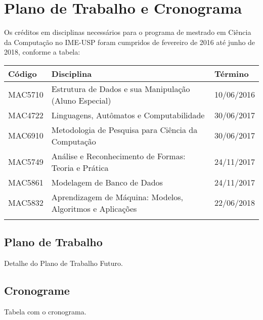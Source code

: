 \chapter{Plano de Trabalho e Cronograma}
\label{cap:Cronogramanotes}

Os créditos em disciplinas necessários para o programa de mestrado em Ciência da Computação
no IME-USP foram cumpridos de fevereiro de 2016 até junho de 2018, conforme a tabela: 

\begin{center}
\begin{tabular}{ |l|l|l| } 
\hline
\textbf{Código} & \textbf{Disciplina}                                       & \textbf{Término} \\ 
\hline
MAC5710     & Estrutura de Dados e sua Manipulação (Aluno Especial)                  & 10/06/2016       \\
MAC4722     & Linguagens, Autômatos e Computabilidade                   & 30/06/2017       \\
MAC6910     & Metodologia de Pesquisa para Ciência da Computação        & 30/06/2017       \\
MAC5749     & Análise e Reconhecimento de Formas: Teoria e Prática      & 24/11/2017       \\
MAC5861     & Modelagem de Banco de Dados                               & 24/11/2017       \\
MAC5832     & Aprendizagem de Máquina: Modelos, Algoritmos e Aplicações & 22/06/2018       \\
\hline
\label{tab:disciplinas}
\end{tabular}
\end{center}

\section{Plano de Trabalho}
\label{sec:plano_de trabalho}

Detalhe do Plano de Trabalho Futuro. 

\section{Cronograme}
\label{sec:Cronograma}

Tabela com o cronograma.